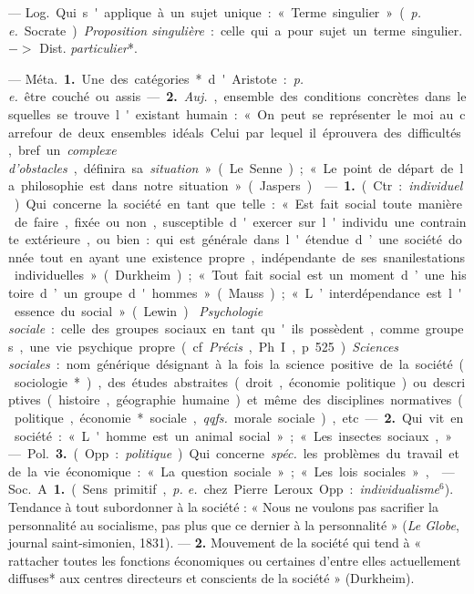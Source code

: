\begin{itemize}[leftmargin=1cm, label=, itemsep=1pt]
 — \si{Log.} Qui s'applique à un sujet unique : « Terme
singulier » ({\it p. e.} Socrate). {\it Proposition singulière} : celle qui a
pour sujet un terme singulier. $->$ Dist. {\it particulier}*.

 — \si{Méta.} {\bf 1.} Une des catégories* d'Aristote :
{\it p. e.} être couché ou assis. — {\bf 2.} {\it Auj.}, ensemble des
conditions concrètes dans lesquelles se trouve l'existant humain : « On peut
se représenter le moi au carrefour de deux ensembles idéals. Celui par lequel
il éprouvera des
difficultés, bref un {\it complexe d’obstacles}, définira sa {\it situation}
» (Le Senne) ; « Le point de départ de la philosophie est dans notre
situation » (Jaspers).

 — {\bf 1.} (Ctr. : {\it individuel}). Qui concerne la société en
tant que telle : « Est fait social toute manière de faire, fixée ou non,
susceptible d'exercer sur l'individu une contrainte extérieure, ou bien : qui
est générale dans l'étendue d’une société donnée tout en ayant une existence
propre, indépendante de ses snanilestations individuelles. » (Durkheim) ; «
Tout fait social est un moment d’une histoire d’un groupe d'hommes.
» (Mauss) ; « L’interdépendance est l'essence du social » (Lewin). {\it
Psychologie sociale} : celle des groupes sociaux en tant qu'ils possèdent,
comme groupes, une vie psychique propre (cf. {\it Précis}, Ph. I, p. 525).
{\it Sciences sociales} : nom générique désignant à la fois la science
positive de la société (sociologie*), des études abstraites (droit, économie
politique) ou descriptives (histoire, géographie humaine) et même des
disciplines normatives (politique, économie* sociale, {\it qqfs.} morale
sociale), etc. — {\bf 2.} Qui vit en société : « L'homme est un animal social
» ; « Les insectes sociaux, »

— \si{Pol.} {\bf 3.} (Opp. : {\it politique}). Qui
concerne {\it spéc.} les problèmes du travail et de la vie économique : « La
question sociale »; « Les lois sociales »,

 — \si{Soc.} A. {\bf 1.} (Sens primitif, {\it p. e.} chez
Pierre Leroux. Opp. : {\it individualisme}$^6$). Tendance à tout subordonner
à la société : « Nous ne voulons pas sacrifier la personnalité au socialisme,
pas plus que ce dernier à la personnalité » ({\it Le Globe}, journal
saint-simonien, 1831). — {\bf 2.} Mouvement de la société qui tend à
« rattacher toutes les fonctions économiques ou certaines d’entre elles
actuellement diffuses* aux centres directeurs et conscients de la
société » (Durkheim).


\end{itemize}
